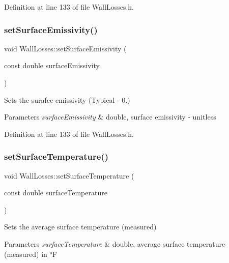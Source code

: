Definition at line 133 of file Wall\+Losses.\+h.

\mbox{\label{class_wall_losses_ad0ebd1a0a1b32a2358da15b6c8e63d3a}} 
\subsubsection{\texorpdfstring{set\+Surface\+Emissivity()}{setSurfaceEmissivity()}\hspace{0.1cm}{\footnotesize\ttfamily [3/3]}}
{\footnotesize\ttfamily void Wall\+Losses\+::set\+Surface\+Emissivity (\begin{DoxyParamCaption}\item[{const double}]{surface\+Emissivity }\end{DoxyParamCaption})\hspace{0.3cm}{\ttfamily [inline]}}

Sets the surafce emissivity (Typical -\/ 0.) 
\begin{DoxyParams}{Parameters}
{\em surface\+Emissivity} & double, surface emissivity -\/ unitless \\
\hline
\end{DoxyParams}


Definition at line 133 of file Wall\+Losses.\+h.

\mbox{\label{class_wall_losses_a7aaa1bd0d7e0ec67db33668ccc6c48da}} 
\subsubsection{\texorpdfstring{set\+Surface\+Temperature()}{setSurfaceTemperature()}\hspace{0.1cm}{\footnotesize\ttfamily [1/3]}}
{\footnotesize\ttfamily void Wall\+Losses\+::set\+Surface\+Temperature (\begin{DoxyParamCaption}\item[{const double}]{surface\+Temperature }\end{DoxyParamCaption})\hspace{0.3cm}{\ttfamily [inline]}}

Sets the average surface temperature (measured) 
\begin{DoxyParams}{Parameters}
{\em surface\+Temperature} & double, average surface temperature (measured) in °F \\
\hline
\end{DoxyParams}


